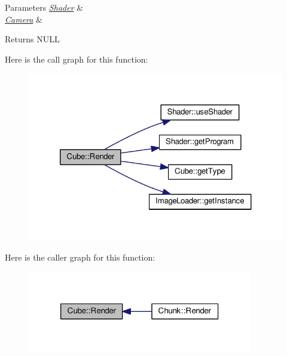 \begin{DoxyParams}{Parameters}
{\em \hyperlink{class_shader}{Shader}} & \\
\hline
{\em \hyperlink{class_camera}{Camera}} & \\
\hline
\end{DoxyParams}
\begin{DoxyReturn}{Returns}
N\+U\+L\+L 
\end{DoxyReturn}


Here is the call graph for this function\+:\nopagebreak
\begin{figure}[H]
\begin{center}
\leavevmode
\includegraphics[width=324pt]{class_cube_aeeeccb9eb5da6e9d8114be298742cf00_cgraph}
\end{center}
\end{figure}




Here is the caller graph for this function\+:\nopagebreak
\begin{figure}[H]
\begin{center}
\leavevmode
\includegraphics[width=278pt]{class_cube_aeeeccb9eb5da6e9d8114be298742cf00_icgraph}
\end{center}
\end{figure}


\hypertarget{class_cube_a6940368c7d15292b4bccdf3ffc67ec93}{}
